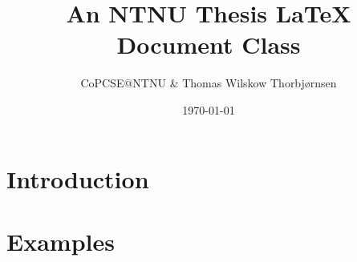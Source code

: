 \documentclass[british,titlepage]{ntnuthesis}
\title{An NTNU Thesis \LaTeX{} Document Class}
\author{CoPCSE$@$NTNU \& Thomas Wilskow Thorbjørnsen}
\date{\today}
\begin{document}
\tableofcontents

\printglossaries

\chapter{Introduction}
    

\chapter{Examples}
    
\end{document}
